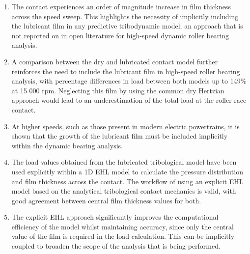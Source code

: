 \begin{enumerate}
	\item The contact experiences an order of magnitude increase in film thickness across the speed sweep. This highlights the necessity of implicitly including the lubricant film in any predictive tribodynamic model; an approach that is not reported on in open literature for high-speed dynamic roller bearing analysis.
	\item A comparison between the dry and lubricated contact model further reinforces the need to include the lubricant film in high-speed roller bearing analysis, with percentage differences in load between both models up to 149\% at 15 000 rpm. Neglecting this film by using the common dry Hertzian approach would lead to an underestimation of the total load at the roller-race contact. 
	\item At higher speeds, such as those present in modern electric powertrains, it is shown that the growth of the lubricant film must be included implicitly within the dynamic bearing analysis.
	\item The load values obtained from the lubricated tribological model have been used explicitly within a 1D EHL model to calculate the pressure distribution and film thickness across the contact. The workflow of using an explicit EHL model based on the analytical tribological contact mechanics is valid, with good agreement between central film thickness values for both. 
	\item The explicit EHL approach significantly improves the computational efficiency of the model whilst maintaining accuracy, since only the central value of the film is required in the load calculation. This can be implicitly coupled to broaden the scope of the analysis that is being performed.
\end{enumerate}